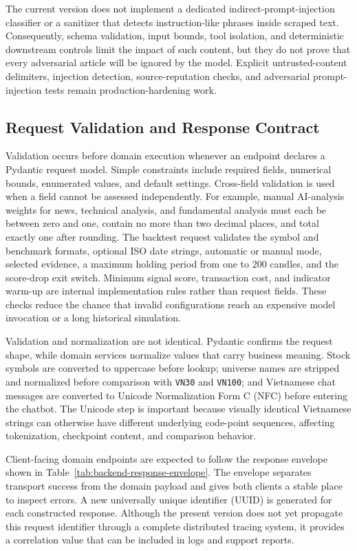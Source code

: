 The current version does not implement a dedicated indirect-prompt-injection classifier or a sanitizer that detects instruction-like phrases inside scraped text. Consequently, schema validation, input bounds, tool isolation, and deterministic downstream controls limit the impact of such content, but they do not prove that every adversarial article will be ignored by the model. Explicit untrusted-content delimiters, injection detection, source-reputation checks, and adversarial prompt-injection tests remain production-hardening work.

\subsection{Request Validation and Response Contract}
\label{subsec:backend-validation-response}

Validation occurs before domain execution whenever an endpoint declares a Pydantic request model. Simple constraints include required fields, numerical bounds, enumerated values, and default settings. Cross-field validation is used when a field cannot be assessed independently. For example, manual AI-analysis weights for news, technical analysis, and fundamental analysis must each be between zero and one, contain no more than two decimal places, and total exactly one after rounding. The backtest request validates the symbol and benchmark formats, optional ISO date strings, automatic or manual mode, selected evidence, a maximum holding period from one to 200 candles, and the score-drop exit switch. Minimum signal score, transaction cost, and indicator warm-up are internal implementation rules rather than request fields. These checks reduce the chance that invalid configurations reach an expensive model invocation or a long historical simulation.

Validation and normalization are not identical. Pydantic confirms the request shape, while domain services normalize values that carry business meaning. Stock symbols are converted to uppercase before lookup; universe names are stripped and normalized before comparison with \texttt{VN30} and \texttt{VN100}; and Vietnamese chat messages are converted to Unicode Normalization Form C (NFC) before entering the chatbot. The Unicode step is important because visually identical Vietnamese strings can otherwise have different underlying code-point sequences, affecting tokenization, checkpoint content, and comparison behavior.

Client-facing domain endpoints are expected to follow the response envelope shown in Table~\ref{tab:backend-response-envelope}. The envelope separates transport success from the domain payload and gives both clients a stable place to inspect errors. A new universally unique identifier (UUID) is generated for each constructed response. Although the present version does not yet propagate this request identifier through a complete distributed tracing system, it provides a correlation value that can be included in logs and support reports.

